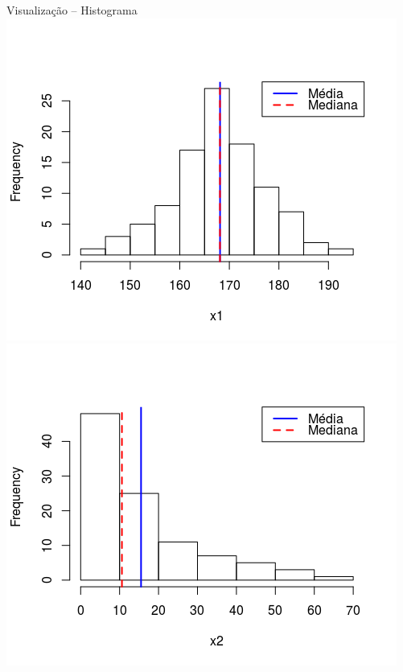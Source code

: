 \documentclass{beamer}
\begin{document}
\begin{frame}{\scriptsize Visualização -- Histograma}
  \centering
  \includegraphics[width=.5\textwidth]{Cap37-38/normal2-h}
  \includegraphics[width=.5\textwidth]{Cap37-38/lognormal2-h}
\end{frame}
\end{document}
